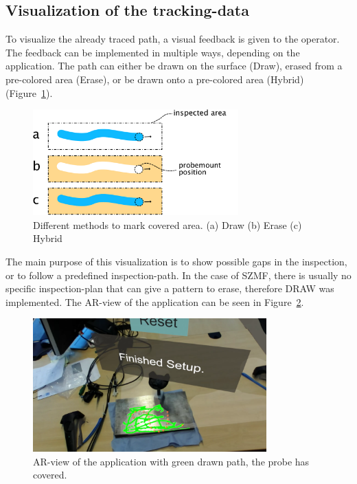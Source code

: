 \documentclass{VRARWorkshop}
\begin{document}
\subsection{Visualization of the tracking-data}
\label{sec:DrawVsErase}
To visualize the already traced path, a visual feedback is given to the operator.
The feedback can be implemented in multiple ways, depending on the application.
The path can either be drawn on the surface ({\sc Draw}), erased from a pre-colored area ({\sc Erase}), or be drawn onto a pre-colored area ({\sc Hybrid}) (Figure~\ref{fig:DrawVsErase}).

\begin{figure}[h!]
    \begin{center}
        \includegraphics[width=79mm]{images/DrawVsErase}
        \caption{\label{fig:DrawVsErase} Different methods to mark covered area. (a) {\sc Draw} (b) {\sc Erase} (c) {\sc Hybrid}}
    \end{center}
\end{figure}

The main purpose of this visualization is to show possible gaps in the inspection, or to follow a predefined inspection-path.
In the case of SZMF, there is usually no specific inspection-plan that can give a pattern to erase, therefore {\sc DRAW} was implemented.
The AR-view of the application can be seen in Figure~\ref{fig:ARView}.

\begin{figure}[h!]
    \begin{center}
        \includegraphics[width=90mm]{images/AR-Screenshot}
        \caption{\label{fig:ARView} AR-view of the application with green drawn path, the probe has covered.}
    \end{center}
\end{figure}
\end{document}
